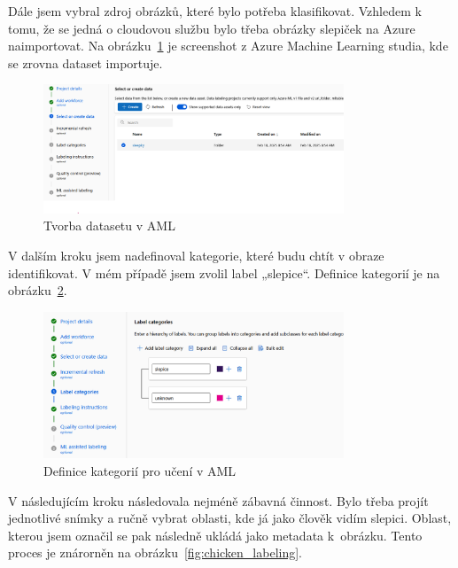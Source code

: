 Dále jsem vybral zdroj obrázků, které bylo potřeba klasifikovat.
Vzhledem k tomu, že se jedná o cloudovou službu bylo třeba obrázky slepiček na Azure naimportovat.
Na obrázku~\ref{fig:dataset_selection} je screenshot z Azure Machine Learning studia, kde se zrovna dataset importuje.

\begin{figure}[htbp]
    \centering
    \includegraphics[width=0.8\textwidth]{img/dataset_selection}
    \caption{Tvorba datasetu v AML}
    \label{fig:dataset_selection}
\end{figure}

V dalším kroku jsem nadefinoval kategorie, které budu chtít v obraze identifikovat.
V mém případě jsem zvolil label „slepice“.
Definice kategorií je na obrázku~\ref{fig:category_definition}.

\begin{figure}[htbp]
    \centering
    \includegraphics[width=0.8\textwidth]{img/category_definition}
    \caption{Definice kategorií pro učení v AML}
    \label{fig:category_definition}
\end{figure}

V následujícím kroku následovala nejméně zábavná činnost.
Bylo třeba projít jednotlivé snímky a ručně vybrat oblasti, kde já jako člověk vidím slepici.
Oblast, kterou jsem označil se pak následně ukládá jako metadata k~obrázku.
Tento proces je znárorněn na obrázku~\ref{fig:chicken_labeling}.

